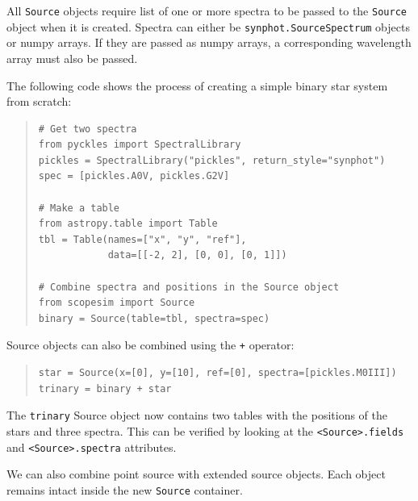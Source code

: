 All \texttt{Source} objects require list of one or more spectra to be passed to the \texttt{Source} object when it is created.
Spectra can either be \texttt{synphot.SourceSpectrum} objects or numpy arrays.
If they are passed as numpy arrays, a corresponding wavelength array must also be passed.


The following code shows the process of creating a simple binary star system from scratch:

\begin{quote}
\begin{alltt}
\begin{lstlisting}[frame=single]
# Get two spectra
from pyckles import SpectralLibrary
pickles = SpectralLibrary("pickles", return_style="synphot")
spec = [pickles.A0V, pickles.G2V]

# Make a table
from astropy.table import Table
tbl = Table(names=["x", "y", "ref"],
            data=[[-2, 2], [0, 0], [0, 1]])

# Combine spectra and positions in the Source object
from scopesim import Source
binary = Source(table=tbl, spectra=spec)
\end{lstlisting}
\end{alltt}
\end{quote}

Source objects can also be combined using the \texttt{+} operator:

\begin{quote}
\begin{alltt}
\begin{lstlisting}[frame=single]
star = Source(x=[0], y=[10], ref=[0], spectra=[pickles.M0III])
trinary = binary + star
\end{lstlisting}
\end{alltt}
\end{quote}

The \texttt{trinary} Source object now contains two tables with the positions of the stars and three spectra.
This can be verified by looking at the \texttt{<Source>.fields} and \texttt{<Source>.spectra} attributes.

We can also combine point source with extended source objects.
Each object remains intact inside the new \texttt{Source} container.

